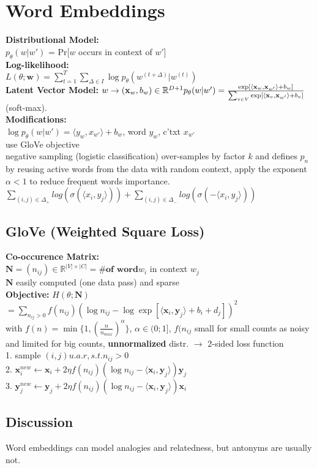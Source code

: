 \section{Word Embeddings}
\textbf{Distributional Model:}\\
$p_\theta(w|w')$ = Pr[$w$ occurs in context of $w'$]\\
\textbf{Log-likelihood:}\\
$L(\theta; \mathbf{w}) = \sum_{t=1}^T\sum_{\Delta \in I}{\log p_\theta(w^{(t+\Delta)}|w^{(t)})}$\\
\textbf{Latent Vector Model:} $w \rightarrow (\mathbf{x}_w, b_w) \in \mathbb{R}^{D+1} \\p_{\theta}(w|w') = \frac{\exp[\langle \mathbf{x}_w,\mathbf{x}_{w'}\rangle + b_w]}{\sum_{v\in V}{\exp[\langle \mathbf{x}_v,\mathbf{x}_{w'}\rangle + b_v ]}}$ (soft-max).\\
\textbf{Modifications:}\\
$\log p_{\theta}(w|w') = \langle  y_{w} , x_{w'} \rangle + b_w$,  word $y_w$, c'txt $x_{w'}$\\
use GloVe objective\\
negative sampling (logistic classification) over-samples by factor $k$ and defines $p_n$ by reusing active words from the data with random context, apply the exponent $\alpha<1$ to reduce frequent words importance.\\
$
\sum_{(i,j)\in\Delta_+}log(\sigma(\langle x_i, y_j\rangle)) + \sum_{(i,j)\in\Delta_-}log(\sigma(-\langle x_i, y_j\rangle))
$
\subsection*{GloVe (Weighted Square Loss)}
\textbf{Co-occurence Matrix:}\\
$\textbf{N} = (n_{ij}) \in \mathbb{R}^{|V|\times|C|} = \textbf{\# of word} w_i$ in context $w_j$\\
$\textbf{N}$ easily computed (one data pass) and sparse\\
\textbf{Objective:} $H(\theta;\textbf{N})$\\
$= \sum_{n_{ij} > 0} f(n_{ij})(\log n_{ij} - \log \exp[\langle \textbf{x}_i, \textbf{y}_j \rangle + b_i + d_j])^2$\\
with $f(n) = \min\{1, (\frac{n}{n_{max}})^\alpha\}$, $\alpha \in (0;1]$, $f(n_{ij}$ small for small counts as noisy and limited for big counts,
\textbf{unnormalized} distr. $\rightarrow$ 2-sided loss function\\
1. sample $(i,j) u.a.r, s.t. n_{ij}>0$\\
2. $\mathbf{x}_i^{new} \leftarrow \mathbf{x}_i + 2\eta f(n_{ij})(\log n_{ij} - \langle \mathbf{x}_i, \mathbf{y}_j \rangle)\mathbf{y}_j$\\
3. $\mathbf{y}_j^{new} \leftarrow \mathbf{y}_j + 2\eta f(n_{ij})(\log n_{ij} - \langle \mathbf{x}_i, \mathbf{y}_j \rangle)\mathbf{x}_i$

\subsection*{Discussion}
Word embeddings can model analogies and relatedness, but antonyms are usually not.
